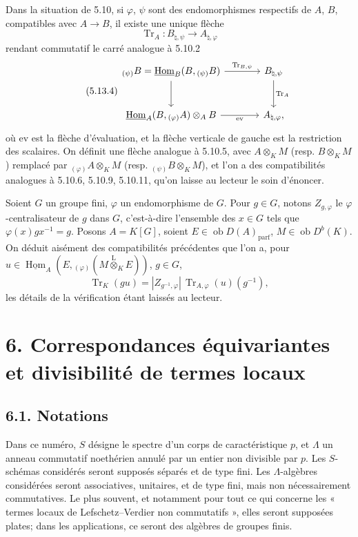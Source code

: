 \documentclass[11pt]{article}
\DeclareMathOperator{\Hom}{Hom}
\newcommand{\ob}{\operatorname{ob}}
\providecommand{\uHom}{\underline{\Hom}}
\providecommand{\Tr}{\operatorname{Tr}}
\providecommand{\Tr}{\operatorname{Tr}}
\providecommand{\lten}{\overset{\mathrm L}{\otimes}}
\providecommand{\Tr}{\operatorname{Tr}}
\providecommand{\Hom}{\operatorname{Hom}}
\providecommand{\ob}{\operatorname{ob}}
\providecommand{\lten}{\overset{\mathrm L}{\otimes}}
\providecommand{\lten}{\overset{\mathrm L}{\otimes}}
\providecommand{\Tr}{\operatorname{Tr}}
\providecommand{\lten}{\overset{\mathrm L}{\otimes}}
\providecommand{\lten}{\overset{\mathrm L}{\otimes}}
\providecommand{\lten}{\overset{\mathrm L}{\otimes}}
\providecommand{\Hom}{\operatorname{Hom}}
\providecommand{\Tr}{\operatorname{Tr}}
\providecommand{\lten}{\overset{\mathrm L}{\otimes}}
\begin{document}
Dans la situation de 5.10, si $\varphi$, $\psi$ sont des endomorphismes respectifs de $A$, $B$, compatibles avec $A\to B$, il existe une unique flèche
\[
\Tr_A:B_{\natural,\psi}\longrightarrow A_{\natural,\varphi}
\]
rendant commutatif le carré analogue à 5.10.2
\begin{equation}\tag{5.13.4}
\begin{tikzcd}[column sep=large,row sep=large]
{}_{(\psi)}B=\uHom_B(B,{}_{(\psi)}B) \arrow[r,"\Tr_{B,\psi}"] \arrow[d] & B_{\natural,\psi} \arrow[d,"\Tr_A"]\\
\uHom_A(B,{}_{(\varphi)}A)\otimes_AB \arrow[r,"\mathrm{ev}"'] & A_{\natural,\varphi},
\end{tikzcd}
\end{equation}
où $\mathrm{ev}$ est la flèche d'évaluation, et la flèche verticale de gauche est la restriction des scalaires. On définit une flèche analogue à 5.10.5, avec $A\otimes_KM$ (resp. $B\otimes_KM$) remplacé par ${}_{(\varphi)}A\otimes_KM$ (resp. ${}_{(\psi)}B\otimes_KM$), et l'on a des compatibilités analogues à 5.10.6, 5.10.9, 5.10.11, qu'on laisse au lecteur le soin d'énoncer.

Soient $G$ un groupe fini, $\varphi$ un endomorphisme de $G$. Pour $g\in G$, notons $Z_{g,\varphi}$ le $\varphi$-centralisateur de $g$ dans $G$, c'est-à-dire l'ensemble des $x\in G$ tels que $\varphi(x)gx^{-1}=g$. Posons $A=K[G]$, soient $E\in\ob D(A)_{\mathrm{parf}}$, $M\in\ob D^b(K)$. On déduit aisément des compatibilités précédentes que l'on a, pour $u\in\uHom_A(E,{}_{(\varphi)}(M\lten_KE))$, $g\in G$,
\begin{equation}\tag{5.13.5}
\Tr_K(gu)=|Z_{g^{-1},\varphi}|\,\Tr_{A,\varphi}(u)(g^{-1}),
\end{equation}
les détails de la vérification étant laissés au lecteur.

\section*{6. Correspondances équivariantes et divisibilité de termes locaux}

\subsection*{6.1. Notations}

Dans ce numéro, $S$ désigne le spectre d'un corps de caractéristique $p$, et $\Lambda$ un anneau commutatif noethérien annulé par un entier non divisible par $p$. Les $S$-schémas considérés seront supposés séparés et de type fini. Les $\Lambda$-algèbres considérées seront associatives, unitaires, et de type fini, mais non nécessairement commutatives. Le plus souvent, et notamment pour tout ce qui concerne les « termes locaux de Lefschetz--Verdier non commutatifs », elles seront supposées plates; dans les applications, ce seront des algèbres de groupes finis.
\end{document}
